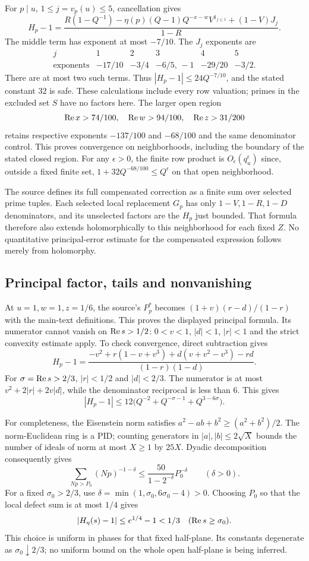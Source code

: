 For $p\mid u$, $1\le j=v_p(u)\le5$, cancellation gives
\[
 H_p-1=\frac{R(1-Q^{-1})
 -\eta(p)(Q-1)Q^{-x-w}V^{1_{j\le1}}+(1-V)J_j}{1-R}.
\]
The middle term has exponent at most $-7/10$. The $J_j$ exponents are
\[
\begin{array}{c|ccccc}
 j&1&2&3&4&5\\\hline
 \text{exponents}&-17/10&-3/4&-6/5,\,-1&-29/20&-3/2.
\end{array}
\]
There are at most two such terms. Thus $|H_p-1|\le24Q^{-7/10}$,
and the stated constant $32$ is safe. These calculations include every
row valuation; primes in the excluded set $S$ have no factors here.
The larger open region
\[
 \operatorname{Re} x>74/100,\quad \operatorname{Re} w>94/100,\quad \operatorname{Re} z>31/200
\]
retains respective exponents $-137/100$ and $-68/100$ and the same
denominator control. This proves convergence on neighborhoods, including
the boundary of the stated closed region. For any $\epsilon>0$,
the finite row product is $O_\epsilon(q_u^\epsilon)$ since, outside a
fixed finite set, $1+32Q^{-68/100}\le Q^\epsilon$ on that open neighborhood.

The source defines its full compensated correction as a finite sum over
selected prime tuples. Each selected local replacement $G_p$ has only
$1-V,1-R,1-D$ denominators, and its unselected factors are the $H_p$
just bounded. That formula therefore also extends holomorphically to
this neighborhood for each fixed $Z$. No quantitative principal-error
estimate for the compensated expression follows merely from holomorphy.

\subsection{Principal factor, tails and nonvanishing}
At $u=1,w=1,z=1/6$, the source's $P_p^*$ becomes
$(1+v)(r-d)/(1-r)$ with the main-text definitions. This proves the
displayed principal formula. Its numerator cannot vanish on $\operatorname{Re} s>1/2$:
$0<v<1$, $|d|<1$, $|r|<1$ and the strict convexity estimate apply.
To check convergence, direct subtraction gives
\[
 H_p-1=\frac{-v^2+r(1-v+v^3)+d(v+v^2-v^3)-rd}
                  {(1-r)(1-d)}.
\]
For $\sigma=\operatorname{Re} s>2/3$, $|r|<1/2$ and $|d|<2/3$.
The numerator is at most $v^2+2|r|+2v|d|$, while the denominator
reciprocal is less than $6$. This gives
\[
 |H_p-1|\le12\bigl(Q^{-2}+Q^{-\sigma-1}+Q^{3-6\sigma}\bigr).
\]

For completeness, the Eisenstein norm satisfies
$a^2-ab+b^2\ge(a^2+b^2)/2$. The norm-Euclidean ring is a PID;
counting generators in $|a|,|b|\le2\sqrt X$ bounds the number of
ideals of norm at most $X\ge1$ by $25X$.
Dyadic decomposition consequently gives
\[
 \sum_{Np>P_0}(Np)^{-1-\delta}
 \le\frac{50}{1-2^{-\delta}}P_0^{-\delta}\qquad(\delta>0).
\]
For a fixed $\sigma_0>2/3$, use
$\delta=\min(1,\sigma_0,6\sigma_0-4)>0$.
Choosing $P_0$ so that the local defect sum is at most $1/4$ gives
\[
 |H_\eta(s)-1|\le e^{1/4}-1<1/3
       \quad(\operatorname{Re} s\ge\sigma_0).
\]
This choice is uniform in phases for that fixed half-plane. Its constants
degenerate as $\sigma_0\downarrow2/3$; no uniform bound on the whole
open half-plane is being inferred.

